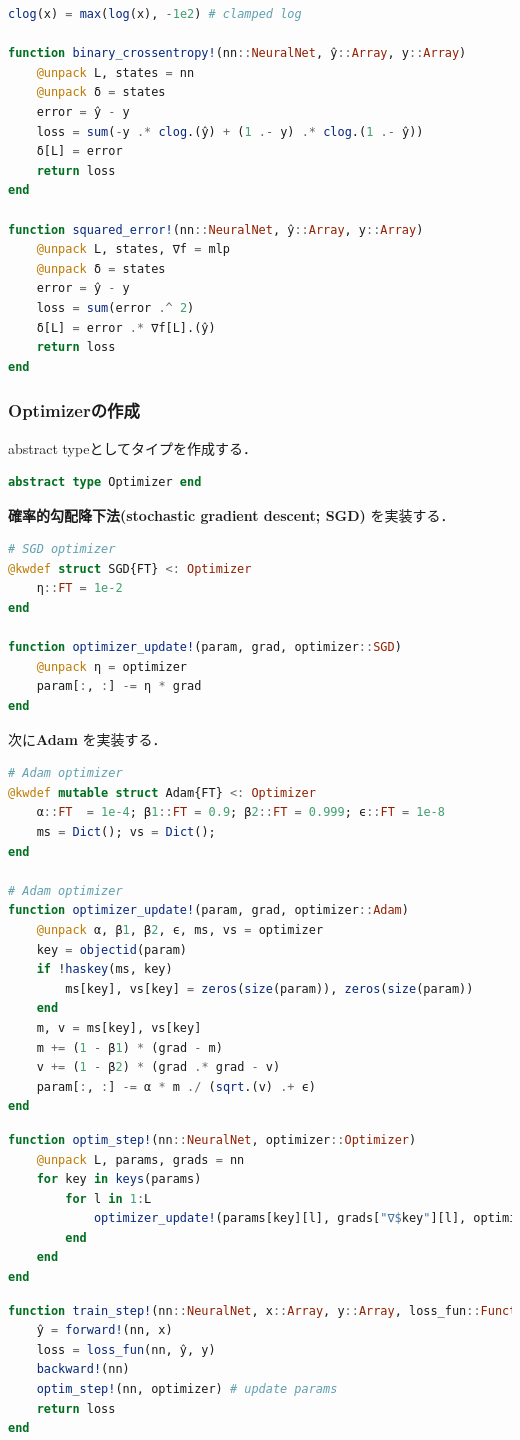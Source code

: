 \begin{lstlisting}[language=julia]
clog(x) = max(log(x), -1e2) # clamped log

function binary_crossentropy!(nn::NeuralNet, ŷ::Array, y::Array)
    @unpack L, states = nn
    @unpack δ = states
    error = ŷ - y
    loss = sum(-y .* clog.(ŷ) + (1 .- y) .* clog.(1 .- ŷ))
    δ[L] = error
    return loss
end

function squared_error!(nn::NeuralNet, ŷ::Array, y::Array)
    @unpack L, states, ∇f = mlp
    @unpack δ = states
    error = ŷ - y
    loss = sum(error .^ 2)
    δ[L] = error .* ∇f[L].(ŷ)
    return loss
end
\end{lstlisting}
\subsubsection{Optimizerの作成}
abstract typeとしてタイプを作成する．
\begin{lstlisting}[language=julia]
abstract type Optimizer end
\end{lstlisting}
\textbf{確率的勾配降下法(stochastic gradient descent; SGD)} を実装する．
\begin{lstlisting}[language=julia]
# SGD optimizer
@kwdef struct SGD{FT} <: Optimizer
    η::FT = 1e-2
end

function optimizer_update!(param, grad, optimizer::SGD)
    @unpack η = optimizer
    param[:, :] -= η * grad
end
\end{lstlisting}
次に\textbf{Adam} \citep{Kingma2014-fm} を実装する．
\begin{lstlisting}[language=julia]
# Adam optimizer
@kwdef mutable struct Adam{FT} <: Optimizer
    α::FT  = 1e-4; β1::FT = 0.9; β2::FT = 0.999; ϵ::FT = 1e-8
    ms = Dict(); vs = Dict();
end

# Adam optimizer
function optimizer_update!(param, grad, optimizer::Adam)
    @unpack α, β1, β2, ϵ, ms, vs = optimizer
    key = objectid(param)
    if !haskey(ms, key) 
        ms[key], vs[key] = zeros(size(param)), zeros(size(param))
    end    
    m, v = ms[key], vs[key]
    m += (1 - β1) * (grad - m)
    v += (1 - β2) * (grad .* grad - v)
    param[:, :] -= α * m ./ (sqrt.(v) .+ ϵ)
end
\end{lstlisting}
\begin{lstlisting}[language=julia]
function optim_step!(nn::NeuralNet, optimizer::Optimizer)
    @unpack L, params, grads = nn
    for key in keys(params)
        for l in 1:L
            optimizer_update!(params[key][l], grads["∇$key"][l], optimizer)
        end
    end
end
\end{lstlisting}
\begin{lstlisting}[language=julia]
function train_step!(nn::NeuralNet, x::Array, y::Array, loss_fun::Function, optimizer::Optimizer=SGD())
    ŷ = forward!(nn, x)
    loss = loss_fun(nn, ŷ, y)
    backward!(nn)
    optim_step!(nn, optimizer) # update params
    return loss
end
\end{lstlisting}
